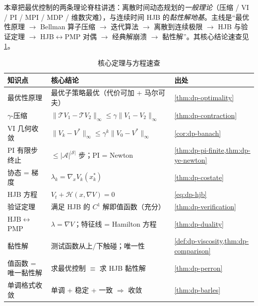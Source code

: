 本章把最优控制的两条理论脊柱讲透：离散时间动态规划的\emph{一般理论}（压缩 / VI / PI / MPI / MDP / 维数灾难），与连续时间 HJB 的\emph{黏性解地基}。主线是“最优性原理 $\to$ Bellman 算子压缩 $\to$ 迭代算法 $\to$ 离散到连续极限 $\to$ HJB 与验证定理 $\to$ HJB$\leftrightarrow$PMP 对偶 $\to$ 经典解崩溃 $\to$ 黏性解”。其核心结论速查见 \cref{tab:dp-summary}。

\begin{table}[H]\centering\small
\caption{核心定理与方程速查}
\label{tab:dp-summary}
\begin{tabular}{lll}
\toprule
知识点 & 核心结论 & 出处 \\
\midrule
最优性原理 & 最优子策略最优（代价可加 + 马尔可夫） & \cref{thm:dp-optimality} \\
$\gamma$-压缩 & $\|\mathcal TV_1-\mathcal TV_2\|_\infty\le\gamma\|V_1-V_2\|_\infty$ & \cref{thm:dp-contraction} \\
VI 几何收敛 & $\|V_k-V^*\|_\infty\le\gamma^k\|V_0-V^*\|_\infty$ & \cref{cor:dp-banach} \\
PI 有限步终止 & $\le|\mathcal A|^{|\mathcal S|}$ 步；PI = Newton & \cref{thm:dp-pi-finite,thm:dp-ye-newton} \\
协态 = 梯度 & $\lambda_k=\nabla_xV_k(x_k^*)$ & \cref{thm:dp-costate} \\
HJB 方程 & $V_t+\mathcal H(x,\nabla V)=0$ & \cref{eq:dp-hjb} \\
验证定理 & 满足 HJB 的 $C^1$ 解即值函数（充分） & \cref{thm:dp-verification} \\
HJB$\leftrightarrow$PMP & $\lambda=\nabla V$；特征线 = Hamilton 方程 & \cref{thm:dp-duality} \\
黏性解 & 测试函数从上/下触碰；唯一性 & \cref{def:dp-viscosity,thm:dp-comparison} \\
值函数 = 唯一黏性解 & 求最优控制 $\equiv$ 求 HJB 黏性解 & \cref{thm:dp-perron} \\
单调格式收敛 & 单调 + 稳定 + 一致 $\Rightarrow$ 收敛 & \cref{thm:dp-barles} \\
\bottomrule
\end{tabular}
\end{table}

